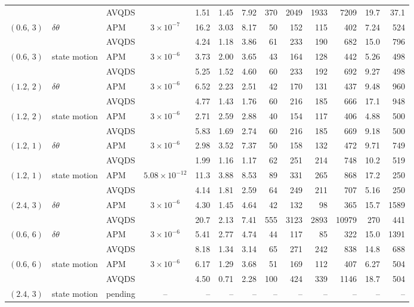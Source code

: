 {\begin{table}[t]
\begin{tabular}{lllcrrrrrrrrr}
 &  & AVQDS &  & 1.51 & 1.45 & 7.92 & 370 & 2049 & 1933 & 7209 & 19.7 & 37.1 \\
\addlinespace[1.5pt]
$(0.6,\,3)$ & $\delta\theta$ & APM & $3\times10^{-7}$ & 16.2 & 3.03 & 8.17 & 50 & 152 & 115 & 402 & 7.24 & 524 \\
 &  & AVQDS &  & 4.24 & 1.18 & 3.86 & 61 & 233 & 190 & 682 & 15.0 & 796 \\
\addlinespace[1.5pt]
$(0.6,\,3)$ & state motion & APM & $3\times10^{-6}$ & 3.73 & 2.00 & 3.65 & 43 & 164 & 128 & 442 & 5.26 & 498 \\
 &  & AVQDS &  & 5.25 & 1.52 & 4.60 & 60 & 233 & 192 & 692 & 9.27 & 498 \\
\addlinespace[1.5pt]
$(1.2,\,2)$ & $\delta\theta$ & APM & $3\times10^{-6}$ & 6.52 & 2.23 & 2.51 & 42 & 170 & 131 & 437 & 9.48 & 960 \\
 &  & AVQDS &  & 4.77 & 1.43 & 1.76 & 60 & 216 & 185 & 666 & 17.1 & 948 \\
\addlinespace[1.5pt]
$(1.2,\,2)$ & state motion & APM & $3\times10^{-6}$ & 2.71 & 2.59 & 2.88 & 40 & 154 & 117 & 406 & 4.88 & 500 \\
 &  & AVQDS &  & 5.83 & 1.69 & 2.74 & 60 & 216 & 185 & 669 & 9.18 & 500 \\
\addlinespace[1.5pt]
$(1.2,\,1)$ & $\delta\theta$ & APM & $3\times10^{-6}$ & 2.98 & 3.52 & 7.37 & 50 & 158 & 132 & 472 & 9.71 & 749 \\
 &  & AVQDS &  & 1.99 & 1.16 & 1.17 & 62 & 251 & 214 & 748 & 10.2 & 519 \\
\addlinespace[1.5pt]
$(1.2,\,1)$ & state motion & APM & $5.08\times10^{-12}$ & 11.3 & 3.88 & 8.53 & 89 & 331 & 265 & 868 & 17.2 & 250 \\
 &  & AVQDS &  & 4.14 & 1.81 & 2.59 & 64 & 249 & 211 & 707 & 5.16 & 250 \\
\addlinespace[1.5pt]
$(2.4,\,3)$ & $\delta\theta$ & APM & $3\times10^{-6}$ & 4.30 & 1.45 & 4.64 & 42 & 132 & 98 & 365 & 15.7 & 1589 \\
 &  & AVQDS &  & 20.7 & 2.13 & 7.41 & 555 & 3123 & 2893 & 10979 & 270 & 441 \\
\addlinespace[1.5pt]
$(0.6,\,6)$ & $\delta\theta$ & APM & $3\times10^{-6}$ & 5.41 & 2.77 & 4.74 & 44 & 117 & 85 & 322 & 15.0 & 1391 \\
 &  & AVQDS &  & 8.18 & 1.34 & 3.14 & 65 & 271 & 242 & 838 & 14.8 & 688 \\
\addlinespace[1.5pt]
$(0.6,\,6)$ & state motion & APM & $3\times10^{-6}$ & 6.17 & 1.29 & 3.68 & 51 & 169 & 112 & 407 & 6.27 & 504 \\
 &  & AVQDS &  & 4.50 & 0.71 & 2.28 & 100 & 424 & 339 & 1146 & 18.7 & 504 \\
\addlinespace[1.5pt]
$(2.4,\,3)$ & state motion & pending & -- & -- & -- & -- & -- & -- & -- & -- & -- & -- \\
\bottomrule
\end{tabular}
\end{table}
}

